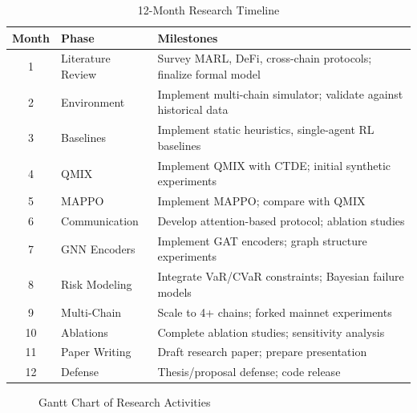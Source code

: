 \documentclass[11pt,a4paper]{article}
\begin{document}
\begin{table}[H]
\centering
\caption{12-Month Research Timeline}
\label{tab:timeline}
\begin{tabular}{@{}clp{8cm}@{}}
\toprule
\textbf{Month} & \textbf{Phase} & \textbf{Milestones} \\
\midrule
1 & Literature Review & Survey MARL, DeFi, cross-chain protocols; finalize formal model \\
2 & Environment & Implement multi-chain simulator; validate against historical data \\
3 & Baselines & Implement static heuristics, single-agent RL baselines \\
4 & QMIX & Implement QMIX with CTDE; initial synthetic experiments \\
5 & MAPPO & Implement MAPPO; compare with QMIX \\
6 & Communication & Develop attention-based protocol; ablation studies \\
7 & GNN Encoders & Implement GAT encoders; graph structure experiments \\
8 & Risk Modeling & Integrate VaR/CVaR constraints; Bayesian failure models \\
9 & Multi-Chain & Scale to 4+ chains; forked mainnet experiments \\
10 & Ablations & Complete ablation studies; sensitivity analysis \\
11 & Paper Writing & Draft research paper; prepare presentation \\
12 & Defense & Thesis/proposal defense; code release \\
\bottomrule
\end{tabular}
\end{table}

\begin{figure}[H]
\centering
{}
\caption{Gantt Chart of Research Activities}
\label{fig:gantt}
\end{figure}
\end{document}

